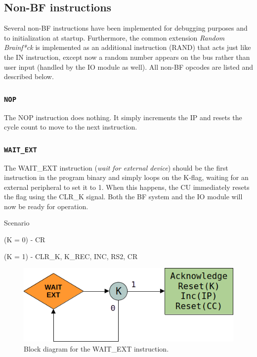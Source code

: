 \subsection{Non-BF instructions} \label{seq:sequences:nonbf}
Several non-BF instructions have been implemented for debugging purposes and to initialization at startup. Furthermore, the common extension \emph{Random Brainf*ck} \cite{esolangs-rbf} is implemented as an additional instruction (RAND) that acts just like the IN instruction, except now a random number appears on the bus rather than user input (handled by the IO module as well). All non-BF opcodes are listed and described below.

\subsubsection{\texttt{NOP}}
The NOP instruction does nothing. It simply increments the IP and resets the cycle count to move to the next instruction.

\subsubsection{\texttt{WAIT\_EXT}}
The WAIT\_EXT instruction (\emph{wait for external device}) should be the first instruction in the program binary and simply loops on the K-flag, waiting for an external peripheral to set it to 1. When this happens, the CU immediately resets the flag using the CLR\_K signal. Both the BF system and the IO module will now be ready for operation.

\begin{labeledenum}{Scenario}
\item (K = 0) - CR
\item (K = 1) - CLR\_K, K\_REC, INC, RS2, CR
\end{labeledenum}

\begin{figure}[H]
  \centering
  \includegraphics[scale=0.4]{img/waitextalg}
  \caption{Block diagram for the WAIT\_EXT instruction.}
  \label{fig:rightalg}
\end{figure}


